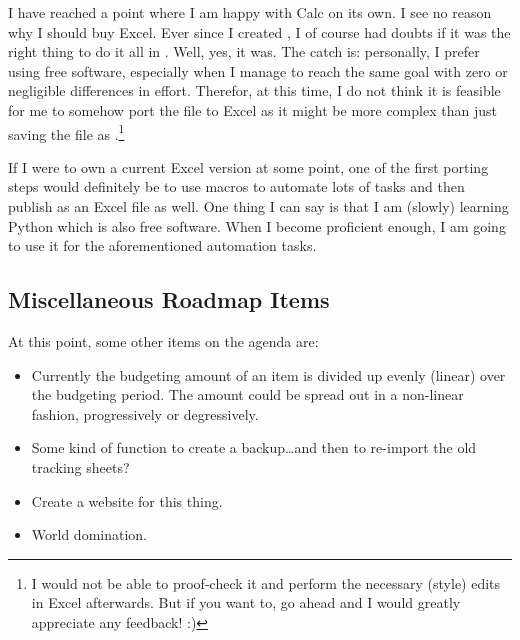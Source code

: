 I have reached a point where I am happy with Calc on its own.
I see no reason why I should buy Excel.
Ever since I created \tfn, I of course had doubts if it was the right thing to do it all in \loc.
Well, yes, it was.
The catch is: personally, I prefer using free software, especially when I manage to reach the same goal with zero or negligible differences in effort.
Therefor, at this time, I do not think it is feasible for me to somehow port the file to Excel as it might be more complex than just saving the file as .\footnote{I would not be able to proof-check it and perform the necessary (style) edits in Excel afterwards.
But if you want to, go ahead and I would greatly appreciate any feedback! :)}

If I were to own a current Excel version at some point, one of the first porting steps would definitely be to use macros to automate lots of tasks and then publish \tfn as an Excel file as well.
One thing I can say is that I am (slowly) learning Python which is also free software.
When I become proficient enough, I am going to use it for the aforementioned automation tasks.

\subsection{Miscellaneous Roadmap Items}
\label{subsec:misc-roadmap-items}

At this point, some other items on the agenda are:
\begin{itemize}
	\item Currently the budgeting amount of an item is divided up evenly (\ie linear) over the budgeting period.
	The amount could be spread out in a non-linear fashion, \eg progressively or degressively.
	\item Some kind of function to create a backup\ldots and then to re-import the old tracking sheets?
	\item Create a website for this thing.
	\item World domination.
\end{itemize}

